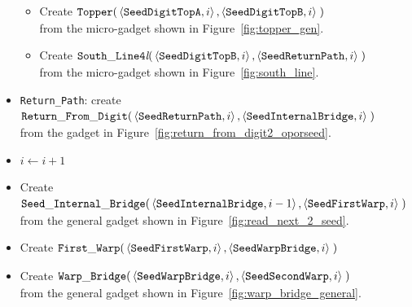 \begin{itemize}
\begin{itemize}
        \item Create
        $\begin{aligned}[t]
            {\tt Topper}(& \left \langle {\tt SeedDigitTopA}, i \right\rangle,
                           \left \langle {\tt SeedDigitTopB}, i \right\rangle \;)
        \end{aligned}$\\ from the micro-gadget shown in Figure~\ref{fig:topper_gen}.

        \item Create
        $\begin{aligned}[t]
            {\tt South\_Line4\textit{l}}(& \left \langle {\tt SeedDigitTopB}, i \right\rangle,
                                           \left \langle {\tt SeedReturnPath},  i \right\rangle \;)
        \end{aligned}$\\ from the micro-gadget shown in Figure~\ref{fig:south_line}.
    \end{itemize}


    \item {\tt Return\_Path}: create
    $\begin{aligned}[t]
        {\tt Return\_From\_Digit}(&\left\langle {\tt SeedReturnPath},     i \right\rangle,
                          \left\langle {\tt SeedInternalBridge}, i \right\rangle \;)
    \end{aligned}$\\ from the gadget in Figure~\ref{fig:return_from_digit2_oporseed}.


    \item $i \gets i + 1$

    \item Create
    $\begin{aligned}[t]
        {\tt Seed\_Internal\_Bridge}(&\left\langle {\tt SeedInternalBridge}, i - 1 \right\rangle,
                                      \left\langle {\tt SeedFirstWarp}, i \right\rangle \;)
    \end{aligned}$\\ from the general gadget shown in Figure~\ref{fig:read_next_2_seed}.

    \item Create
    $\begin{aligned}[t]
        {\tt First\_Warp}(&\left\langle {\tt SeedFirstWarp},  i \right\rangle,
                    \left\langle {\tt SeedWarpBridge}, i \right\rangle \;)
    \end{aligned}$

    \item Create
    $\begin{aligned}[t]
        {\tt Warp\_Bridge}(&\left\langle {\tt SeedWarpBridge}, i \right\rangle,
                     \left\langle {\tt SeedSecondWarp}, i \right\rangle \;)
    \end{aligned}$\\ from the general gadget shown in Figure~\ref{fig:warp_bridge_general}.


\end{itemize}
